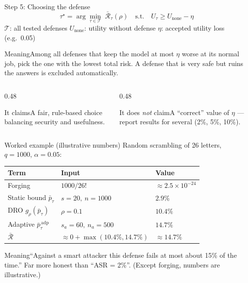 \documentclass[aspectratio=169,11pt]{beamer}
\newcommand{\pbar}{\bar p_\tau}
\newcommand{\padp}{\bar p^{\,\mathrm{adp}}_\tau}
\newcommand{\plain}[1]{\begin{block}{Meaning}#1\end{block}}
\newcommand{\claims}[2]{%
  \begin{columns}[T]
    \begin{column}{0.48\textwidth}
      \begin{exampleblock}{It claims}#1\end{exampleblock}
    \end{column}
    \begin{column}{0.48\textwidth}
      \begin{alertblock}{It does \emph{not} claim}#2\end{alertblock}
    \end{column}
  \end{columns}}
\begin{document}
\begin{frame}{Step 5: Choosing the defense}
  \[
    \boxed{\;
    \tau^\star = \arg\min_{\tau \in \mathcal{T}} \; \bar{\mathcal{R}}_\tau(\rho)
    \quad \text{s.t.} \quad U_\tau \ge U_{\text{none}} - \eta \;}
  \]
  \small
  $\mathcal{T}$: all tested defenses \quad $U_{\text{none}}$: utility without defense \quad $\eta$: accepted utility loss (e.g.\ 0.05)
  \plain{Among all defenses that keep the model at most $\eta$ worse at its normal job, pick the one with the lowest total risk. A defense that is very safe but ruins the answers is excluded automatically.}
  \claims{A fair, rule-based choice balancing security and usefulness.}
  {A ``correct'' value of $\eta$ --- report results for several (2\%, 5\%, 10\%).}
\end{frame}

\begin{frame}{Worked example (illustrative numbers)}
  \small
  Random scrambling of 26 letters, $q=1000$, $\alpha=0.05$:
  \vspace{0.3em}
  \begin{center}
  \begin{tabular}{@{}lll@{}}
    \toprule
    \textbf{Term} & \textbf{Input} & \textbf{Value} \\
    \midrule
    Forging & $1000/26!$ & $\approx 2.5\times10^{-24}$ \\
    Static bound $\pbar$ & $s=20,\ n=1000$ & $2.9\%$ \\
    DRO $g_\rho(\pbar)$ & $\rho = 0.1$ & $10.4\%$ \\
    Adaptive $\padp$ & $s_a=60,\ n_a=500$ & $14.7\%$ \\
    \midrule
    $\bar{\mathcal{R}}$ & $\approx 0 + \max(10.4\%, 14.7\%)$ & $\mathbf{\approx 14.7\%}$ \\
    \bottomrule
  \end{tabular}
  \end{center}
  \plain{``Against a smart attacker this defense fails at most about 15\% of the time.'' Far more honest than ``ASR = 2\%''. (Except forging, numbers are illustrative.)}
\end{frame}
\end{document}
